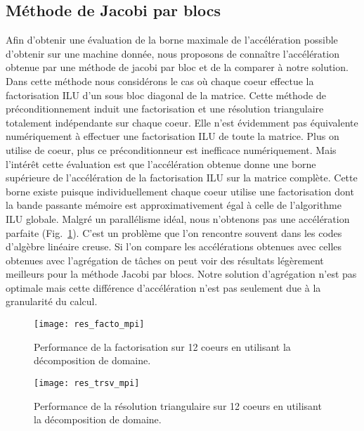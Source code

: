 \subsection{Méthode de Jacobi par blocs}
Afin d'obtenir une évaluation de la borne maximale de l'accélération possible d'obtenir sur une machine donnée, nous proposons de connaître l'accélération obtenue par une méthode de jacobi par bloc et de la comparer à notre solution.
%
Dans cette méthode nous considérons le cas où chaque coeur effectue la factorisation ILU d'un sous bloc diagonal de la matrice.
%
Cette méthode de préconditionnement induit une factorisation et une résolution triangulaire totalement indépendante sur chaque coeur.
%
Elle n'est évidemment pas équivalente numériquement à effectuer une factorisation ILU de toute la matrice.
%
Plus on utilise de coeur, plus ce préconditionneur est inefficace numériquement\cite{domain_decomp}.
%
Mais l'intérêt cette évaluation est que l'accélération obtenue donne une borne supérieure de l'accélération de la factorisation ILU sur la matrice complète.
%
Cette borne existe puisque individuellement chaque coeur utilise une factorisation dont la bande passante mémoire est approximativement égal à celle de l'algorithme ILU globale.
%
Malgré un parallélisme idéal, nous n'obtenons pas une accélération parfaite (Fig.~\ref{fig:res_facto_mpi}).
%
C'est un problème que l'on rencontre souvent dans les codes d'algèbre linéaire creuse.
%
Si l'on compare les accélérations obtenues avec celles obtenues avec l'agrégation de tâches on peut voir des résultats légèrement meilleurs pour la méthode Jacobi par blocs.
%
Notre solution d'agrégation n'est pas optimale mais cette différence d'accélération n'est pas seulement due à la granularité du calcul.


\begin{figure}
  \centering
  \texttt{[image: res\_facto\_mpi]}
  \caption{Performance de la factorisation sur 12 coeurs en utilisant la décomposition de domaine.}
  \label{fig:res_facto_mpi}
\end{figure}

\begin{figure}
  \centering
  \texttt{[image: res\_trsv\_mpi]}
  \caption{Performance de la résolution triangulaire sur 12 coeurs en utilisant la décomposition de domaine.}
  \label{fig:res_trsv_mpi}
\end{figure}


